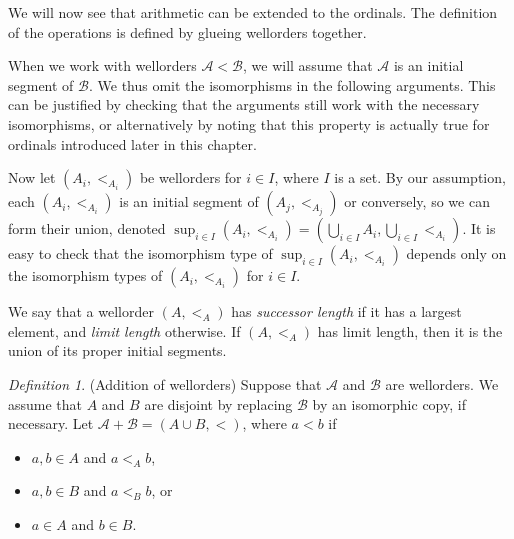 \documentclass[a4paper, 11pt]{amsart}
\theoremstyle{remark}
\newtheorem{definition}[definition]{Definition}
\newcommand{\cB}{\mathcal B}
\newcommand{\cA}{\mathcal A}
\newenvironment{itemizenew}{\begin{itemize}[leftmargin=2pc]}{\end{itemize}}
\begin{document}
We will now see that arithmetic can be extended to the ordinals. 
The definition of the operations is defined by glueing wellorders together. 

When we work with wellorders $\cA < \cB$, we will assume that $\cA$ is an initial segment of $\cB$. 
We thus omit the isomorphisms in the following arguments. 
This can be justified by checking that the arguments still work with the necessary isomorphisms, or alternatively by noting that this property is actually true for ordinals introduced later in this chapter. 



Now let $(A_i,<_{A_i})$ be wellorders for $i\in I$, where $I$ is a set. 
By our assumption, each $(A_i,<_{A_i})$ is an initial segment of $(A_j,<_{A_j})$ or conversely, so we can form their union, denoted $\sup_{i\in I} (A_i,<_{A_i})= (\bigcup_{i\in I}A_i , \bigcup_{i\in I}<_{A_i} )$. 
It is easy to check that the isomorphism type of $\sup_{i\in I} (A_i,<_{A_i})$ depends only on the isomorphism types of $(A_i,<_{A_i})$ for $i\in I$. 

We say that a wellorder $(A,<_A)$ has \emph{successor length} if it has a largest element, and \emph{limit length} otherwise. 
If $(A,<_A)$ has limit length, then it is the union of its proper initial segments. 

\begin{definition}(Addition of wellorders) 
Suppose that $\cA$ and $\cB$ are wellorders. 
We assume that $A$ and $B$ are disjoint by replacing $\cB$ by an isomorphic copy, if necessary. 
Let $\cA + \cB= (A\cup B, <)$, where $a<b$ if 
\begin{itemizenew} 
\item 
 $a,b\in A$ and $a<_A b$, 
\item 
$a,b\in B$ and $a<_B b$, or 
\item 
$a\in A$ and $b\in B$. 
\end{itemizenew} 
\end{definition} 
\end{document}

